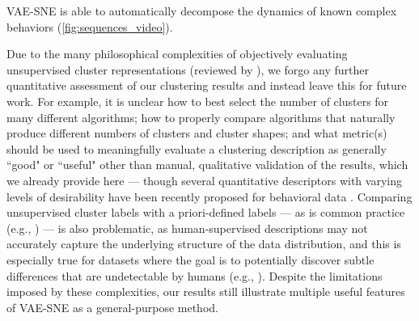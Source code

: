 \documentclass[11pt,a4paper,twoside]{book}
\begin{document}
\begin{doublespace}
VAE-SNE is able to automatically decompose the dynamics of known complex behaviors (\ref{fig:sequences_video}).

Due to the many philosophical complexities of objectively evaluating unsupervised cluster representations (reviewed by \citealt{jain1999data, kleinberg2003impossibility, todd2017systematic}), we forgo any further quantitative assessment of our clustering results and instead leave this for future work. For example, it is unclear how to best select the number of clusters for many different algorithms; how to properly compare algorithms that naturally produce different numbers of clusters and cluster shapes; and what metric(s) should be used to meaningfully evaluate a clustering description as generally ``good" or ``useful" other than manual, qualitative validation of the results, which we already provide here --- though several quantitative descriptors with varying levels of desirability have been recently proposed for behavioral data \citep{todd2017systematic}. Comparing unsupervised cluster labels with a priori-defined labels --- as is common practice (e.g., \citealt{jiang2016variational, xie2016unsupervised, guo2017improved, yang2019deep, luxem2020identifying}) --- is also problematic, as human-supervised descriptions may not accurately capture the underlying structure of the data distribution, and this is especially true for datasets where the goal is to potentially discover subtle differences that are undetectable by humans (e.g., \citealt{wiltschko2015mapping}). Despite the limitations imposed by these complexities, our results still illustrate multiple useful features of VAE-SNE as a general-purpose method.


\end{doublespace}
\end{document}
